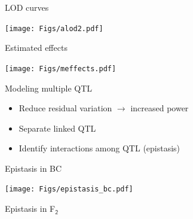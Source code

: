 \documentclass[12pt]{article}
\newcommand{\headsize}{\fontsize{35}{35} \selectfont}
\newcommand{\smallsize}{\fontsize{25}{30} \selectfont}
\begin{document}
\newpage

\headsize \color{myyellow}
\hfill \begin{minipage}{5.75in}
\centering
LOD curves
\end{minipage}

\vfill

\centerline{\texttt{[image: Figs/alod2.pdf]}}

\newpage

\headsize \color{myyellow}
\hfill \begin{minipage}{5.75in}
\centering
Estimated effects
\end{minipage}

\vfill

\centerline{\texttt{[image: Figs/meffects.pdf]}}

\newpage

\headsize \color{myyellow}
\hfill \begin{minipage}{5.75in}
\centering
Modeling multiple QTL 
\end{minipage}

\vspace{3cm}

\color{mywhite} \smallsize

\hfill \begin{minipage}[t]{10in}
\begin{itemize}
\itemsep24pt
\item Reduce residual variation $\longrightarrow$ increased power
   
\item Separate linked QTL

\item Identify interactions among QTL {\color{myblue} (epistasis)}

\end{itemize}
\end{minipage}


\newpage

\headsize \color{myyellow}
\hfill \begin{minipage}{5.75in}
\centering
Epistasis in BC
\end{minipage}

\vfill

\centerline{\texttt{[image: Figs/epistasis\_bc.pdf]}}


\newpage

\headsize \color{myyellow}
\hfill \begin{minipage}{5.75in}
\centering
Epistasis in F$_{\mathsf{2}}$
\end{minipage}
\end{document}
